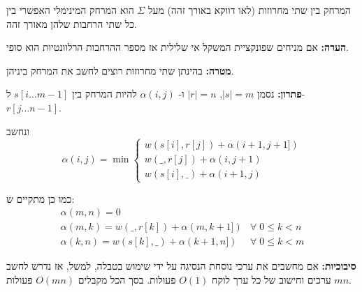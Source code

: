 \begin{definition}[מרחק]
המרחק בין שתי מחרוזות (לאו דווקא באורך זהה) מעל 
$\Sigma$
הוא המרחק המינימלי האפשרי בין כל שתי הרחבות שלהן מאורך זהה.
\end{definition}

\textbf{הערה:}
אם מניחים שפונקציית המשקל אי שלילית אז מספר ההרחבות הרלוונטיות הוא סופי.


\textbf{מטרה:}
בהינתן שתי מחרוזות רוצים לחשב את המרחק ביניהן.

\textbf{פתרון:}
נסמן 
$|s| = m$,
$|r| = n$
ו-%
$\alpha(i, j)$
להיות המרחק בין 
$s[i \ldots m - 1]$ 
ל-%
$r[j \ldots n - 1]$.

ונחשב
$$
\alpha(i, j) = \min
\begin{cases}
w(s[i], r[j]) + \alpha(i + 1, j + 1])
\\
w(\_, r[j]) + \alpha(i, j + 1)
\\
w(s[i], \_) + \alpha(i + 1, j)
\end{cases}
$$

כמו כן מתקיים ש:%
$$
\begin{array}{ll}
\alpha(m, n) = 0
\\
\alpha(m, k) = w(\_, r[k]) + \alpha(m, k + 1])
&
\forall\; 0 \leq k < n 
\\
\alpha(k, n) = w(s[k], \_) + \alpha(k + 1, n])
&
\forall\; 0 \leq k < m
\end{array}
$$

\textbf{סיבוכיות:}
אם מחשבים את ערכי נוסחת הנסיגה על ידי שימוש בטבלה, למשל, אז נדרש לחשב
$mn$
ערכים וחישוב של כל ערך לוקח 
$O(1)$
פעולות.
בסך הכל מקבלים 
$O(mn)$
פעולות.

